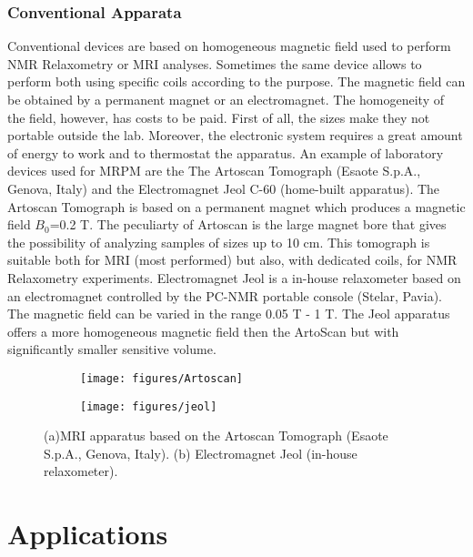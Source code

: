 \documentclass[a4paper,11pt]{report}
\begin{document}
\subsection{Conventional Apparata}

Conventional devices are based on homogeneous magnetic field used to perform NMR Relaxometry or MRI analyses. Sometimes the same device allows to perform both using specific coils according to the purpose. The magnetic field can be obtained by a permanent magnet or an electromagnet. The homogeneity of the field, however, has costs to be paid. First of all, the sizes make they not portable outside the lab. Moreover, the electronic system requires a great amount of energy to work and to thermostat the apparatus.  
An example of laboratory devices used for MRPM are the The Artoscan Tomograph (Esaote S.p.A., Genova, Italy) and the Electromagnet Jeol C-60 (home-built apparatus).
The Artoscan Tomograph is based on a permanent magnet which produces a magnetic field $B_0$=0.2 T. The peculiarty of Artoscan is the large magnet bore that gives the possibility of analyzing samples of sizes up to 10 cm. This tomograph is suitable both for MRI (most performed) but also, with dedicated coils, for NMR Relaxometry experiments. 
Electromagnet Jeol is a in-house relaxometer based on an electromagnet controlled by the PC-NMR portable console (Stelar, Pavia). The magnetic field can be varied in the range 0.05 T - 1 T. The Jeol apparatus offers a more homogeneous magnetic field then the ArtoScan but with significantly smaller sensitive volume.

\begin{figure}[h]
\begin{subfigure}{0.5\textwidth}
\texttt{[image: figures/Artoscan]} 
\caption{}
\label{fig:subim1}
\end{subfigure}
\begin{subfigure}{0.5\textwidth}
\texttt{[image: figures/jeol]}
\caption{}
\label{fig:subim2}
\end{subfigure}
 


\caption{(a)MRI apparatus based on the Artoscan Tomograph (Esaote S.p.A., Genova, Italy). (b) Electromagnet Jeol (in-house relaxometer). }
\end{figure}

\newpage

\chapter{Applications}
\end{document}
